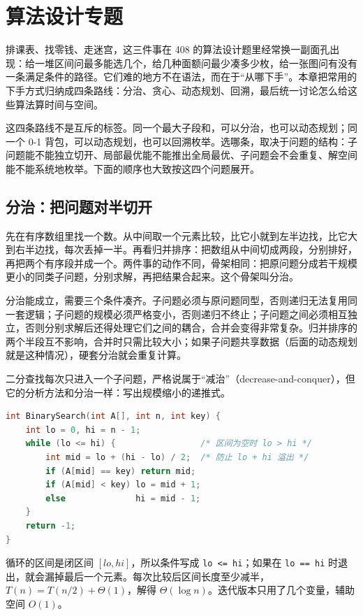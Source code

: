 \section{算法设计专题}

排课表、找零钱、走迷宫，这三件事在 408 的算法设计题里经常换一副面孔出现：给一堆区间问最多能选几个，给几种面额问最少凑多少枚，给一张图问有没有一条满足条件的路径。它们难的地方不在语法，而在于“从哪下手”。本章把常用的下手方式归纳成四条路线：分治、贪心、动态规划、回溯，最后统一讨论怎么给这些算法算时间与空间。

这四条路线不是互斥的标签。同一个最大子段和，可以分治，也可以动态规划；同一个 0-1 背包，可以动态规划，也可以回溯枚举。选哪条，取决于问题的结构：子问题能不能独立切开、局部最优能不能推出全局最优、子问题会不会重复、解空间能不能系统地枚举。下面的顺序也大致按这四个问题展开。

\subsection{分治：把问题对半切开}

先在有序数组里找一个数。从中间取一个元素比较，比它小就到左半边找，比它大到右半边找，每次丢掉一半。再看归并排序：把数组从中间切成两段，分别排好，再把两个有序段并成一个。两件事的动作不同，骨架相同：把原问题分成若干规模更小的同类子问题，分别求解，再把结果合起来。这个骨架叫分治。

分治能成立，需要三个条件凑齐。子问题必须与原问题同型，否则递归无法复用同一套逻辑；子问题的规模必须严格变小，否则递归不终止；子问题之间必须相互独立，否则分别求解后还得处理它们之间的耦合，合并会变得非常复杂。归并排序的两个半段互不影响，合并时只需比较大小；如果子问题共享数据（后面的动态规划就是这种情况），硬套分治就会重复计算。

二分查找每次只进入一个子问题，严格说属于“减治”（decrease-and-conquer），但它的分析方法和分治一样：写出规模缩小的递推式。

\begin{lstlisting}[language=C]
int BinarySearch(int A[], int n, int key) {
    int lo = 0, hi = n - 1;
    while (lo <= hi) {                 /* 区间为空时 lo > hi */
        int mid = lo + (hi - lo) / 2;  /* 防止 lo + hi 溢出 */
        if (A[mid] == key) return mid;
        if (A[mid] < key) lo = mid + 1;
        else              hi = mid - 1;
    }
    return -1;
}
\end{lstlisting}

循环的区间是闭区间 $[lo,hi]$，所以条件写成 \texttt{lo <= hi}；如果在 \texttt{lo == hi} 时退出，就会漏掉最后一个元素。每次比较后区间长度至少减半，$T(n)=T(n/2)+\Theta(1)$，解得 $\Theta(\log n)$。迭代版本只用了几个变量，辅助空间 $O(1)$。

